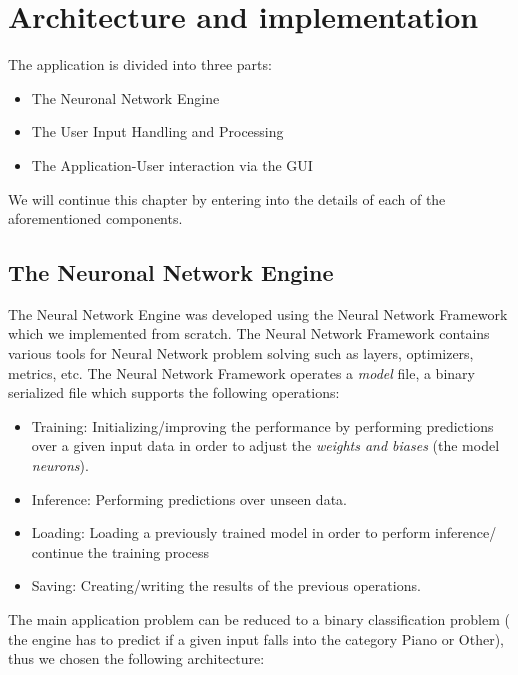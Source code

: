 \chapter{Architecture and implementation}

The application is divided into three parts:
	\begin{itemize}
		\addtolength{\itemindent}{1cm}
		\item The Neuronal Network Engine
		\item The User Input Handling and Processing
		\item The Application-User interaction via the GUI
	\end{itemize}

We will continue this chapter by entering into the details of each of the aforementioned components.

\section{The Neuronal Network Engine}

The Neural Network Engine was developed using the Neural Network Framework which we implemented from scratch. The
Neural Network Framework contains various tools for Neural Network problem solving such as layers, optimizers, metrics,
etc. The Neural Network Framework operates a \textit{model} file, a binary serialized file which supports the following
operations:
	\begin{itemize}
		\item Training: Initializing/improving the performance by performing predictions over a given input
			data in order to adjust the \textit{weights and biases} (the model \textit{neurons}).
		\item Inference: Performing predictions over unseen data.
		\item Loading: Loading a previously trained model in order to perform inference/ continue the training process
		\item Saving: Creating/writing the results of the previous operations.

	\end{itemize}
The main application problem can be reduced to a binary classification problem ( the engine has to predict if a given
input falls into the category Piano or Other), thus we chosen the following architecture:



